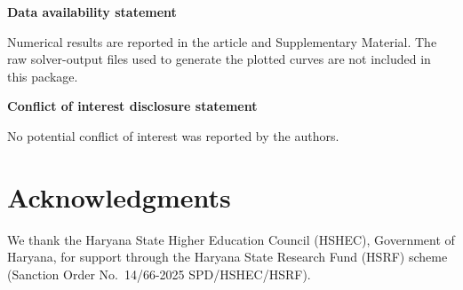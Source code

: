 \documentclass[5p,twocolumn]{elsarticle}
\begin{document}








\clearpage
\raggedbottom

\clearpage
\flushbottom
\appendix



\noindent\textbf{Data availability statement}

Numerical results are reported in the article and Supplementary Material.
The raw solver-output files used to generate the plotted curves are not
included in this package.

\noindent\textbf{Conflict of interest disclosure statement}

No potential conflict of interest was reported by the authors.

\section*{Acknowledgments}
We thank the Haryana State Higher Education Council (HSHEC), Government
of Haryana, for support through the Haryana State Research Fund (HSRF)
scheme (Sanction Order No.~14/66-2025 SPD/HSHEC/HSRF).

\clearpage


\end{document}
